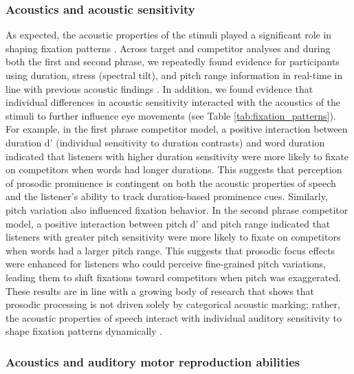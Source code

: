 \subsubsection{Acoustics and acoustic sensitivity}

As expected, the acoustic properties of the stimuli played a significant role in shaping fixation patterns \parencite{magnuson2019fixations}. Across target and competitor analyses and during both the first and second phrase, we repeatedly found evidence for participants using duration, stress (spectral tilt), and pitch range information in real-time in line with previous acoustic findings \textcite{Breen2010,baumann2018makes}. In addition, we found evidence that individual differences in acoustic sensitivity interacted with the acoustics of the stimuli to further influence eye movements (see Table \ref{tab:fixation_patterns}). For example, in the first phrase competitor model, a positive interaction between duration d$’$ (individual sensitivity to duration contrasts) and word duration indicated that listeners with higher duration sensitivity were more likely to fixate on competitors when words had longer durations. This suggests that perception of prosodic prominence is contingent on both the acoustic properties of speech and the listener’s ability to track duration-based prominence cues. Similarly, pitch variation also influenced fixation behavior. In the second phrase competitor model, a positive interaction between pitch d$’$ and pitch range indicated that listeners with greater pitch sensitivity were more likely to fixate on competitors when words had a larger pitch range. This suggests that prosodic focus effects were enhanced for listeners who could perceive fine-grained pitch variations, leading them to shift fixations toward competitors when pitch was exaggerated. These results are in line with a growing body of research that shows that prosodic processing is not driven solely by categorical acoustic marking; rather, the acoustic properties of speech interact with individual auditory sensitivity to shape fixation patterns dynamically \parencite{roy2017individual,ppcc,bramlett_wiener_24_speechprosody,jansen2023influence}.

\subsubsection{Acoustics and auditory motor reproduction abilities}

